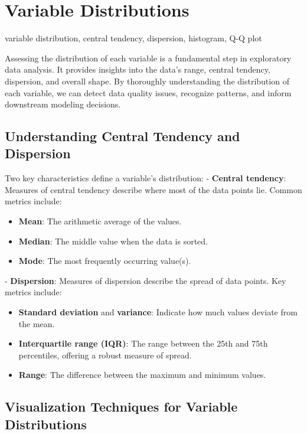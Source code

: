 \documentclass[12pt,openany]{book}
\begin{document}
\section{Variable Distributions}

\begin{keywordsbox}
variable distribution, central tendency, dispersion, histogram, Q-Q plot
\end{keywordsbox}

Assessing the distribution of each variable is a fundamental step in exploratory data analysis. It provides insights into the data's range, central tendency, dispersion, and overall shape. By thoroughly understanding the distribution of each variable, we can detect data quality issues, recognize patterns, and inform downstream modeling decisions.

\subsection{Understanding Central Tendency and Dispersion}

Two key characteristics define a variable’s distribution:  
- \textbf{Central tendency}: Measures of central tendency describe where most of the data points lie. Common metrics include:
  \begin{itemize}
      \item \textbf{Mean}: The arithmetic average of the values.
      \item \textbf{Median}: The middle value when the data is sorted.
      \item \textbf{Mode}: The most frequently occurring value(s).
  \end{itemize}
- \textbf{Dispersion}: Measures of dispersion describe the spread of data points. Key metrics include:
  \begin{itemize}
      \item \textbf{Standard deviation} and \textbf{variance}: Indicate how much values deviate from the mean.
      \item \textbf{Interquartile range (IQR)}: The range between the 25th and 75th percentiles, offering a robust measure of spread.
      \item \textbf{Range}: The difference between the maximum and minimum values.
  \end{itemize}

\subsection{Visualization Techniques for Variable Distributions}
\end{document}
